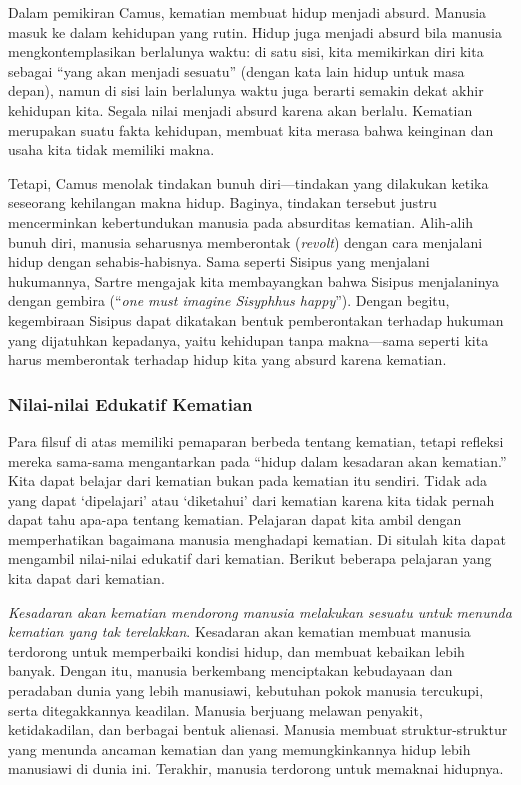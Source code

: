 \documentclass[10pt,a4paper]{article}
\begin{document}
\begin{multicols}{2}
Dalam pemikiran Camus, kematian membuat hidup menjadi absurd. Manusia
masuk ke dalam kehidupan yang rutin. Hidup juga menjadi absurd bila
manusia mengkontemplasikan berlalunya waktu: di satu sisi, kita
memikirkan diri kita sebagai ``yang akan menjadi sesuatu'' (dengan kata
lain hidup untuk masa depan), namun di sisi lain berlalunya waktu juga
berarti semakin dekat akhir kehidupan kita. Segala nilai menjadi absurd
karena akan berlalu. Kematian merupakan suatu fakta kehidupan, membuat
kita merasa bahwa keinginan dan usaha kita tidak memiliki makna.

Tetapi, Camus menolak tindakan bunuh diri---tindakan yang dilakukan
ketika seseorang kehilangan makna hidup. Baginya, tindakan tersebut
justru mencerminkan kebertundukan manusia pada absurditas kematian.
Alih-alih bunuh diri, manusia seharusnya memberontak (\emph{revolt})
dengan cara menjalani hidup dengan sehabis-habisnya. Sama seperti
Sisipus yang menjalani hukumannya, Sartre mengajak kita membayangkan
bahwa Sisipus menjalaninya dengan gembira (``\emph{one must imagine
Sisyphhus happy}''). Dengan begitu, kegembiraan Sisipus dapat dikatakan
bentuk pemberontakan terhadap hukuman yang dijatuhkan kepadanya, yaitu
kehidupan tanpa makna---sama seperti kita harus memberontak terhadap
hidup kita yang absurd karena kematian.

\hypertarget{nilai-nilai-edukatif-kematian}{%
\subsubsection{Nilai-nilai Edukatif
Kematian}\label{nilai-nilai-edukatif-kematian}}

Para filsuf di atas memiliki pemaparan berbeda tentang kematian, tetapi
refleksi mereka sama-sama mengantarkan pada ``hidup dalam kesadaran akan
kematian.'' Kita dapat belajar dari kematian bukan pada kematian itu
sendiri. Tidak ada yang dapat `dipelajari' atau `diketahui' dari
kematian karena kita tidak pernah dapat tahu apa-apa tentang kematian.
Pelajaran dapat kita ambil dengan memperhatikan bagaimana manusia
menghadapi kematian. Di situlah kita dapat mengambil nilai-nilai
edukatif dari kematian. Berikut beberapa pelajaran yang kita dapat dari
kematian.

\emph{Kesadaran akan kematian mendorong manusia melakukan sesuatu untuk}
\emph{menunda kematian yang tak terelakkan}. Kesadaran akan kematian
membuat manusia terdorong untuk memperbaiki kondisi hidup, dan membuat
kebaikan lebih banyak. Dengan itu, manusia berkembang menciptakan
kebudayaan dan peradaban dunia yang lebih manusiawi, kebutuhan pokok
manusia tercukupi, serta ditegakkannya keadilan. Manusia berjuang
melawan penyakit, ketidakadilan, dan berbagai bentuk alienasi. Manusia
membuat struktur-struktur yang menunda ancaman kematian dan yang
memungkinkannya hidup lebih manusiawi di dunia ini. Terakhir, manusia
terdorong untuk memaknai hidupnya.


\end{multicols}
\end{document}
